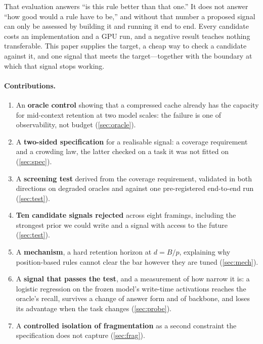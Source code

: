 \documentclass[10pt]{article}
\begin{document}
That evaluation answers ``is this rule better than that one.'' It does not
answer ``how good would a rule have to be,'' and without that number a proposed
signal can only be assessed by building it and running it end to end. Every
candidate costs an implementation and a GPU run, and a negative result teaches
nothing transferable. This paper supplies the target, a cheap way to check a
candidate against it, and one signal that meets the target---together with the
boundary at which that signal stops working.

\paragraph{Contributions.}
\begin{enumerate}\itemsep2pt
\item An \textbf{oracle control} showing that a compressed cache already has
      the capacity for mid-context retention at two model scales: the failure
      is one of observability, not budget (\cref{sec:oracle}).
\item A \textbf{two-sided specification} for a realisable signal: a coverage
      requirement and a crowding law, the latter checked on a task it was not
      fitted on (\cref{sec:spec}).
\item A \textbf{screening test} derived from the coverage requirement,
      validated in both directions on degraded oracles and against one
      pre-registered end-to-end run (\cref{sec:test}).
\item \textbf{Ten candidate signals rejected} across eight framings, including
      the strongest prior we could write and a signal with access to the
      future (\cref{sec:test}).
\item A \textbf{mechanism}, a hard retention horizon at $d = B/p$, explaining
      why position-based rules cannot clear the bar however they are tuned
      (\cref{sec:mech}).
\item A \textbf{signal that passes the test}, and a measurement of how narrow
      it is: a logistic regression on the frozen model's write-time activations
      reaches the oracle's recall, survives a change of answer form and of
      backbone, and loses its advantage when the task changes
      (\cref{sec:probe}).
\item A \textbf{controlled isolation of fragmentation} as a second constraint
      the specification does not capture (\cref{sec:frag}).
\end{enumerate}
\end{document}
